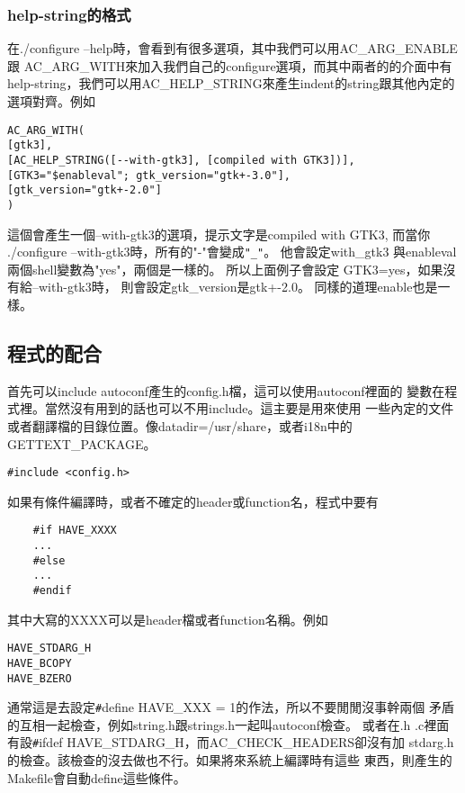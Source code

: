       \subsubsection{help-string的格式}
      在./configure --help時，會看到有很多選項，其中我們可以用AC\_ARG\_ENABLE跟
      AC\_ARG\_WITH來加入我們自己的configure選項，而其中兩者的的介面中有
      help-string，我們可以用AC\_HELP\_STRING來產生indent的string跟其他內定的
      選項對齊。例如
      \begin{verbatim}
AC_ARG_WITH(
[gtk3], 
[AC_HELP_STRING([--with-gtk3], [compiled with GTK3])],
[GTK3="$enableval"; gtk_version="gtk+-3.0"],
[gtk_version="gtk+-2.0"]
)
      \end{verbatim}
      這個會產生一個--with-gtk3的選項，提示文字是compiled with GTK3, 而當你
      ./configure --with-gtk3時，所有的"-"會變成\verb="_"=。 他會設定with\_gtk3
      與enableval兩個shell變數為"yes"，兩個是一樣的。 所以上面例子會設定
      GTK3=yes，如果沒有給--with-gtk3時， 則會設定gtk\_version是gtk+-2.0。
      同樣的道理enable也是一樣。
  \subsection{程式的配合}
  首先可以include autoconf產生的config.h檔，這可以使用autoconf裡面的
  變數在程式裡。當然沒有用到的話也可以不用include。這主要是用來使用
  一些內定的文件或者翻譯檔的目錄位置。像datadir=/usr/share，或者i18n中的
  GETTEXT\_PACKAGE。
  \begin{verbatim}
#include <config.h>
  \end{verbatim}
  如果有條件編譯時，或者不確定的header或function名，程式中要有
  \begin{verbatim}
    #if HAVE_XXXX
    ...
    #else
    ...
    #endif
  \end{verbatim}
  其中大寫的XXXX可以是header檔或者function名稱。例如
  \begin{verbatim}
HAVE_STDARG_H
HAVE_BCOPY
HAVE_BZERO
  \end{verbatim}
  通常這是去設定\verb=#=define HAVE\_XXX = 1的作法，所以不要閒閒沒事幹兩個
  矛盾的互相一起檢查，例如string.h跟strings.h一起叫autoconf檢查。
  或者在.h .c裡面有設\verb=#=ifdef HAVE\_STDARG\_H，而AC\_CHECK\_HEADERS卻沒有加
  stdarg.h的檢查。該檢查的沒去做也不行。如果將來系統上編譯時有這些
  東西，則產生的Makefile會自動define這些條件。

